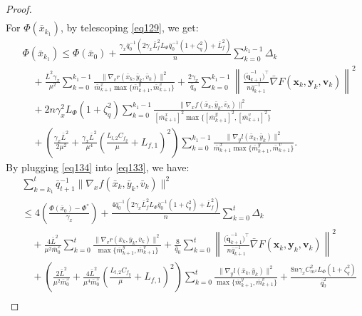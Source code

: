 \documentclass{article}
\theoremstyle{plain}
\theoremstyle{definition}
\theoremstyle{remark}
\begin{document}
\begin{proof}
\begin{align}
\end{align}
For $\Phi(\bar{x}_{k_1})$, by telescoping \cref{eq129}, we get:
\begin{align}
&\Phi(\bar{x}_{k_1})\leq\Phi(\bar{x}_0)+\frac{\gamma_x\bar{q}_{0}^{-1}(2\gamma_x \bar{L}_{f}^2L_\Phi \bar{q}_{0}^{-1} \left(1 +\zeta_q^2\right)+\bar{L}_f^2)}{n} \sum_{k=0}^{k_1-1}\Delta_k\nonumber\\
&\quad + \frac{\bar{L}^2\gamma_x }{\mu^2} \sum_{k=0}^{k_1-1} \frac{\|\nabla_v r(\bar{x}_k, \bar{y}_k, \bar{v}_k)\|^2}{\bar{m}^x_{k+1}\max\{\bar{m}^y_{k+1},\bar{m}^v_{k+1}\}}+ \frac{2\gamma_x}{\bar{q}_{0}}\sum_{k=0}^{k_1-1} \left\| \frac{\big(\tilde{\mathbf{q}}_{k+1}^{-1}\big)^\top}{n\bar{q}_{k+1}^{-1}} \bar{\nabla} F(\mathbf{x}_k, \mathbf{y}_k, \mathbf{v}_k) \right\|^2 
\nonumber\\
&\quad+{2n\gamma_x^2 L_\Phi \left(1 +\zeta_q^2\right)}\sum_{k=0}^{k_1-1}\frac{\|\nabla_x f(\bar{x}_k, \bar{y}_k, \bar{v}_k)\|^2}{[\bar{m}^x_{k+1}]^2\max\{[\bar{m}^y_{k+1}]^2,[\bar{m}^v_{k+1}]^2\}}\nonumber \\
&\quad + \left( \frac{\gamma_x\bar{L}^2}{2\mu^2} + \frac{\gamma_x\bar{L}^2}{\mu^4} \left( \frac{L_{l,2} C_{f_y}}{\mu} + L_{f,1} \right)^2 \right) \sum_{k=0}^{k_1-1}\frac{\|\nabla_y l(\bar{x}_k, \bar{y}_k)\|^2}{\bar{m}^x_{k+1}\max\{\bar{m}^y_{k+1},\bar{m}^v_{k+1}\}}.\label{eq134}
\end{align}
By plugging \cref{eq134} into \cref{eq133}, we have:
\begin{align}
&\sum_{k=k_1}^t  \bar{q}_{t+1}^{-1}\|\nabla_x f(\bar{x}_k, \bar{y}_k, \bar{v}_k)\|^2\nonumber\\
&\leq4\left(\frac{\Phi(\bar{x}_{0})-\Phi^*}{\gamma_x}\right)+\frac{4\bar{q}_{0}^{-1}(2\gamma_x \bar{L}_{f}^2L_\Phi \bar{q}_0^{-1} \left(1 +\zeta_q^2\right)+\bar{L}_f^2)}{n}\sum_{k=0}^t \Delta_k\nonumber\\
&\quad+ \frac{4\bar{L}^2}{\mu^2\bar{m}^x_{0}}\sum_{k=0}^t \frac{\|\nabla_v r(\bar{x}_k, \bar{y}_k, \bar{v}_k)\|^2}{\max\{\bar{m}^y_{k+1},\bar{m}^v_{k+1}\}} + \frac{8}{\bar{q}_{0}}\sum_{k=0}^t \left\| \frac{\big(\tilde{\mathbf{q}}_{k+1}^{-1}\big)^\top}{n\bar{q}_{k+1}^{-1}} \bar{\nabla} F(\mathbf{x}_k, \mathbf{y}_k, \mathbf{v}_k) \right\|^2 \nonumber\\
&\quad+\left( \frac{2\bar{L}^2}{\mu^2\bar{m}^x_{0}} + \frac{4\bar{L}^2}{\mu^4\bar{m}^x_{0}} \left( \frac{L_{l,2} C_{f_y}}{\mu} + L_{f,1} \right)^2 \right)\sum_{k=0}^t \frac{\|\nabla_y l(\bar{x}_k, \bar{y}_k)\|^2}{\max\{\bar{m}^y_{k+1},\bar{m}^v_{k+1}\}}+ \frac{8n\gamma_x C_{m^x}^2 L_\Phi \left(1 +\zeta_q^2\right)}{\bar{q}_0^2}\nonumber\\

\end{align}
\end{proof}
\end{document}

